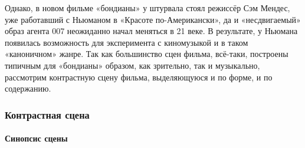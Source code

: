 Однако, в новом фильме «бондианы» у штурвала стоял режиссёр Сэм Мендес, уже работавший с Ньюманом в «Красоте по-Американски», да и «несдвигаемый» образ агента 007 неожиданно начал меняться в 21 веке.
В результате, у Ньюмана появилась возможность для эксперимента с киномузыкой и в таком «каноничном» жанре.
Так как большинство сцен фильма, всё-таки, построены типичным для «бондианы» образом, как зрительно, так и музыкально, рассмотрим контрастную сцену фильма, выделяющуюся и по форме, и по содержанию.

\subsubsection{Контрастная сцена}\label{ux43aux43eux43dux442ux440ux430ux441ux442ux43dux430ux44f-ux441ux446ux435ux43dux430}

\paragraph{Синопсис сцены}\label{ux441ux438ux43dux43eux43fux441ux438ux441-ux441ux446ux435ux43dux44b-7}

